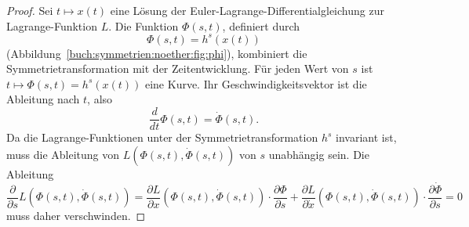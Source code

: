 \begin{proof}
Sei $t\mapsto x(t)$ eine Lösung der Euler-Lagrange-Differentialgleichung
zur Lagrange-Funktion $L$.
Die Funktion $\Phi(s,t)$, definiert durch
\[
\Phi(s,t) = h^s(x(t))
\]
(Abbildung~\ref{buch:symmetrien:noether:fig:phi}),
kombiniert die Symmetrietransformation mit der Zeitentwicklung.
Für jeden Wert von $s$ ist $t\mapsto \Phi(s,t)=h^s(x(t))$ eine 
Kurve.
Ihr Geschwindigkeitsvektor ist die Ableitung nach $t$, also
\[
\frac{d}{dt} \Phi(s,t)
=
\dot{\Phi}(s,t).
\]
Da die Lagrange-Funktionen unter der Symmetrietransformation $h^s$ 
invariant ist, muss die Ableitung von $L(\Phi(s,t), \dot{\Phi}(s,t))$
von $s$ unabhängig sein.
Die Ableitung
\begin{equation}
\frac{\partial}{\partial s} L(\Phi(s,t), \dot{\Phi}(s,t))
=
\frac{\partial L}{\partial x}(\Phi(s,t),\dot{\Phi}(s,t))
\cdot
\frac{\partial \Phi}{\partial s}
+
\frac{\partial L}{\partial \dot{x}}(\Phi(s,t),\dot{\Phi}(s,t))
\cdot
\frac{\partial \dot{\Phi}}{\partial s}
=0
\label{buch:symmetrioen:noether:eqn:sabl}
\end{equation}
muss daher verschwinden.


\end{proof}

